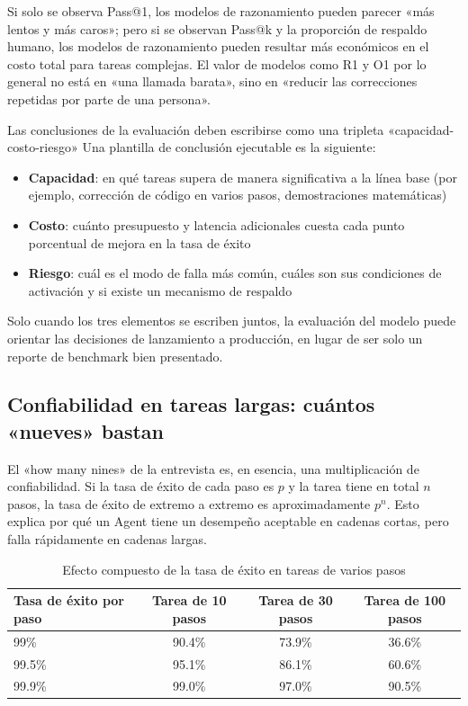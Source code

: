\documentclass[a4paper]{article}
\begin{document}
Si solo se observa Pass@1, los modelos de razonamiento pueden parecer «más lentos y más caros»; pero si se observan Pass@k y la proporción de respaldo humano, los modelos de razonamiento pueden resultar más económicos en el costo total para tareas complejas. El valor de modelos como R1 y O1 por lo general no está en «una llamada barata», sino en «reducir las correcciones repetidas por parte de una persona».

\begin{importantbox}{Las conclusiones de la evaluación deben escribirse como una tripleta «capacidad-costo-riesgo»}
Una plantilla de conclusión ejecutable es la siguiente:
\begin{itemize}
    \item \textbf{Capacidad}: en qué tareas supera de manera significativa a la línea base (por ejemplo, corrección de código en varios pasos, demostraciones matemáticas)
    \item \textbf{Costo}: cuánto presupuesto y latencia adicionales cuesta cada punto porcentual de mejora en la tasa de éxito
    \item \textbf{Riesgo}: cuál es el modo de falla más común, cuáles son sus condiciones de activación y si existe un mecanismo de respaldo
\end{itemize}

Solo cuando los tres elementos se escriben juntos, la evaluación del modelo puede orientar las decisiones de lanzamiento a producción, en lugar de ser solo un reporte de benchmark bien presentado.
\end{importantbox}

\subsection{Confiabilidad en tareas largas: cuántos «nueves» bastan}

El «how many nines» de la entrevista es, en esencia, una multiplicación de confiabilidad. Si la tasa de éxito de cada paso es $p$ y la tarea tiene en total $n$ pasos, la tasa de éxito de extremo a extremo es aproximadamente $p^n$. Esto explica por qué un Agent tiene un desempeño aceptable en cadenas cortas, pero falla rápidamente en cadenas largas.

\begin{table}[H]
\centering
\begin{tabular}{lccc}
\toprule
\textbf{Tasa de éxito por paso} & \textbf{Tarea de 10 pasos} & \textbf{Tarea de 30 pasos} & \textbf{Tarea de 100 pasos} \\
\midrule
99\% & 90.4\% & 73.9\% & 36.6\% \\
99.5\% & 95.1\% & 86.1\% & 60.6\% \\
99.9\% & 99.0\% & 97.0\% & 90.5\% \\
\bottomrule
\end{tabular}
\caption{Efecto compuesto de la tasa de éxito en tareas de varios pasos}
\end{table}
\end{document}
